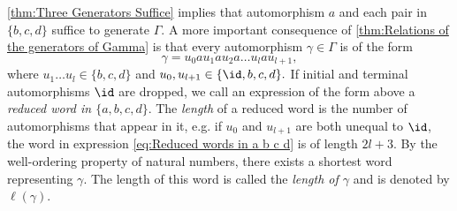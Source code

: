\cref{thm:Three Generators Suffice} implies that automorphism $a$ and each pair in $\lbrace b,c,d\rbrace$ suffice to generate $\Gamma.$ A more important consequence of \cref{thm:Relations of the generators of Gamma} is that every automorphism $\gamma\in\Gamma$ is of the form
\begin{equation}\label{eq:Reduced words in a b c d}
\gamma=u_0au_1au_2a\ldots u_lau_{l+1},
\end{equation}
where $u_1\ldots u_{l}\in\lbrace b,c,d\rbrace$ and $u_0,u_{l+1}\in\lbrace \id,b,c,d\rbrace.$ If initial and terminal automorphisms $\id$ are dropped, we call an expression of the form above a \emph{reduced word in $\lbrace a,b,c,d\rbrace$}. The \emph{length} of a reduced word is the number of automorphisms that appear in it, e.g. if $u_0$ and $u_{l+1}$ are both unequal to $\id$, the word in expression \ref{eq:Reduced words in a b c d} is of length $2l+3$. By the well-ordering property of natural numbers, there exists a shortest word representing $\gamma$. The length of this word is called the \emph{length of $\gamma$} and is denoted by $\ell(\gamma)$. 
